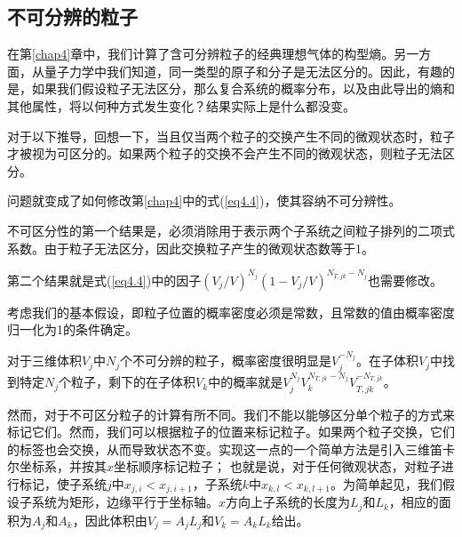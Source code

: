 \documentclass[UTF8]{ctexart}
\numberwithin{equation}{section}%
\numberwithin{figure}{section}%
\begin{document}
    \subsection{不可分辨的粒子}
    在第\ref{chap4}章中，我们计算了含可分辨粒子的经典理想气体的构型熵。另一方面，从量子力学中我们知道，同一类型的原子和分子是无法区分的。因此，有趣的是，如果我们假设粒子无法区分，那么复合系统的概率分布，以及由此导出的熵和其他属性，将以何种方式发生变化？结果实际上是什么都没变。

    对于以下推导，回想一下，当且仅当两个粒子的交换产生不同的微观状态时，粒子才被视为可区分的。如果两个粒子的交换不会产生不同的微观状态，则粒子无法区分。

    问题就变成了如何修改第\ref{chap4}中的式(\ref{eq4.4})，使其容纳不可分辨性。

    不可区分性的第一个结果是，必须消除用于表示两个子系统之间粒子排列的二项式系数。由于粒子无法区分，因此交换粒子产生的微观状态数等于1。

    第二个结果就是式(\ref{eq4.4})中的因子$\left(V_{j} / V\right)^{N_{j}}\left(1-V_{j} / V\right)^{N_{T, j k}-N_{j}}$也需要修改。

    考虑我们的基本假设，即粒子位置的概率密度必须是常数，且常数的值由概率密度归一化为1的条件确定。

    对于三维体积$V_j$中$N_j$个不可分辨的粒子，概率密度很明显是$V_j^{-N_j}$。在子体积$V_j$中找到特定$N_j$个粒子，剩下的在子体积$V_k$中的概率就是$V_{j}^{N_{j}} V_{k}^{N_{T, j k}-N_{j}} V_{T, j k}^{-N_{T, j k}}$。

    然而，对于不可区分粒子的计算有所不同。我们不能以能够区分单个粒子的方式来标记它们。然而，我们可以根据粒子的位置来标记粒子。如果两个粒子交换，它们的标签也会交换，从而导致状态不变。实现这一点的一个简单方法是引入三维笛卡尔坐标系，并按其$x$坐标顺序标记粒子；
    也就是说，对于任何微观状态，对粒子进行标记，使子系统$j$中$x_{j,i}<x_{j,i+1}$，子系统$k$中$x_{k,l}<x_{k,l+1}$。为简单起见，我们假设子系统为矩形，边缘平行于坐标轴。$x$方向上子系统的长度为$L_j$和$L_k$，相应的面积为$A_j$和$A_k$，因此体积由$V_j=A_jL_j$和$V_k=A_kL_k$给出。
\end{document}
